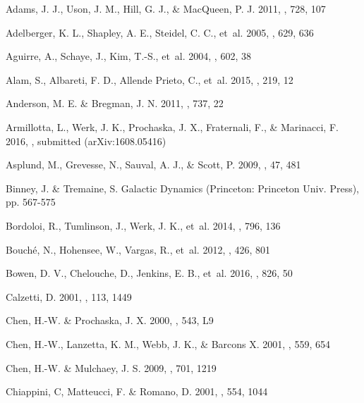 \documentclass[twocolumn,twocolappendix,tighten,times]{aastex6}
\begin{document}
\begin{thebibliography}

 Adams, J. J., Uson, J. M., Hill, G. J., \& MacQueen, P. J. 2011, \apj, 728, 107

 Adelberger, K. L., Shapley, A. E., Steidel, C. C., et~al. 2005, \apj, 629, 636

 Aguirre, A., Schaye, J., Kim, T.-S., et~al. 2004, \apj, 602, 38

 Alam, S., Albareti, F. D., Allende Prieto, C., et~al. 2015, \apjs, 219, 12

 Anderson, M. E. \& Bregman, J. N. 2011, \apj, 737, 22

 Armillotta, L., Werk, J. K., Prochaska, J. X., Fraternali, F., \& Marinacci, F. 2016, \mnras, submitted (arXiv:1608.05416)

 Asplund, M., Grevesse, N., Sauval, A. J., \& Scott, P. 2009, \araa, 47, 481

 Binney, J. \& Tremaine, S. Galactic Dynamics (Princeton: Princeton Univ. Press), pp. 567-575

 Bordoloi, R., Tumlinson, J., Werk, J. K., et~al. 2014, \apj, 796, 136

 Bouch\'e, N., Hohensee, W., Vargas, R., et~al. 2012, \mnras, 426, 801

 Bowen, D. V., Chelouche, D., Jenkins, E. B., et~al. 2016, \apj, 826, 50


 Calzetti, D. 2001, \pasp, 113, 1449

 Chen, H.-W. \& Prochaska, J. X. 2000, \apj, 543, L9

 Chen, H.-W., Lanzetta, K. M., Webb, J. K., \& Barcons X. 2001, \apj, 559, 654

 Chen, H.-W. \& Mulchaey, J. S. 2009, \apj, 701, 1219

 Chiappini, C, Matteucci, F. \& Romano, D. 2001, \apj, 554, 1044


\end{thebibliography}
\end{document}
